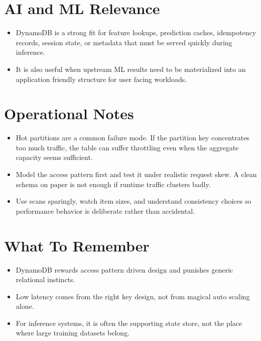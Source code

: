 \documentclass[10pt,twocolumn]{article}
\begin{document}
\section*{AI and ML Relevance}
\begin{itemize}
\item DynamoDB is a strong fit for feature lookups, prediction caches, idempotency records, session state, or metadata that must be served quickly during inference.
\item It is also useful when upstream ML results need to be materialized into an application friendly structure for user facing workloads.
\end{itemize}

\section*{Operational Notes}
\begin{itemize}
\item Hot partitions are a common failure mode. If the partition key concentrates too much traffic, the table can suffer throttling even when the aggregate capacity seems sufficient.
\item Model the access pattern first and test it under realistic request skew. A clean schema on paper is not enough if runtime traffic clusters badly.
\item Use scans sparingly, watch item sizes, and understand consistency choices so performance behavior is deliberate rather than accidental.
\end{itemize}

\section*{What To Remember}
\begin{itemize}
\item DynamoDB rewards access pattern driven design and punishes generic relational instincts.
\item Low latency comes from the right key design, not from magical auto scaling alone.
\item For inference systems, it is often the supporting state store, not the place where large training datasets belong.
\end{itemize}
\end{document}
